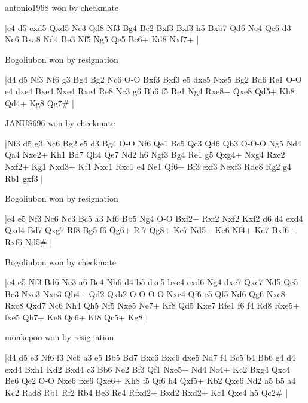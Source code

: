 antonio1968 won by checkmate

\makegametitle
|e4 d5 exd5 Qxd5 Nc3 Qd8 Nf3 Bg4 Be2 Bxf3 Bxf3 h5 Bxb7 Qd6 Ne4 Qe6 d3 Nc6 Bxa8 Nd4 Be3 Nf5 Ng5 Qe5 Bc6+ Kd8 Nxf7+  |

\showboard

Bogoliubon won by resignation

\makegametitle
|d4 d5 Nf3 Nf6 g3 Bg4 Bg2 Nc6 O-O Bxf3 Bxf3 e5 dxe5 Nxe5 Bg2 Bd6 Re1 O-O e4 dxe4 Bxe4 Nxe4 Rxe4 Re8 Nc3 g6 Bh6 f5 Re1 Ng4 Rxe8+ Qxe8 Qd5+ Kh8 Qd4+ Kg8 Qg7\#  |

\showboard

JANUS696 won by checkmate

\makegametitle
|Nf3 d5 g3 Nc6 Bg2 e5 d3 Bg4 O-O Nf6 Qe1 Bc5 Qc3 Qd6 Qb3 O-O-O Ng5 Nd4 Qa4 Nxe2+ Kh1 Bd7 Qh4 Qe7 Nd2 h6 Ngf3 Bg4 Re1 g5 Qxg4+ Nxg4 Rxe2 Nxf2+ Kg1 Nxd3+ Kf1 Nxc1 Rxc1 e4 Ne1 Qf6+ Bf3 exf3 Nexf3 Rde8 Rg2 g4 Rb1 gxf3  |

\showboard

Bogoliubon won by resignation

\makegametitle
|e4 e5 Nf3 Nc6 Nc3 Bc5 a3 Nf6 Bb5 Ng4 O-O Bxf2+ Rxf2 Nxf2 Kxf2 d6 d4 exd4 Qxd4 Bd7 Qxg7 Rf8 Bg5 f6 Qg6+ Rf7 Qg8+ Ke7 Nd5+ Ke6 Nf4+ Ke7 Bxf6+ Rxf6 Nd5\#  |

\showboard

Bogoliubon won by checkmate

\makegametitle
|e4 e5 Nf3 Bd6 Nc3 a6 Bc4 Nh6 d4 b5 dxe5 bxc4 exd6 Ng4 dxc7 Qxc7 Nd5 Qc5 Be3 Nxe3 Nxe3 Qb4+ Qd2 Qxb2 O-O O-O Nxc4 Qf6 e5 Qf5 Nd6 Qg6 Nxc8 Rxc8 Qxd7 Nc6 Nh4 Qh5 Nf5 Nxe5 Ne7+ Kf8 Qd5 Kxe7 Rfe1 f6 f4 Rd8 Rxe5+ fxe5 Qb7+ Ke8 Qc6+ Kf8 Qc5+ Kg8  |

\showboard

monkepoo won by resignation

\makegametitle
|d4 d5 e3 Nf6 f3 Nc6 a3 e5 Bb5 Bd7 Bxc6 Bxc6 dxe5 Nd7 f4 Bc5 b4 Bb6 g4 d4 exd4 Bxh1 Kd2 Bxd4 c3 Bb6 Ne2 Bf3 Qf1 Nxe5+ Nd4 Nc4+ Kc2 Bxg4 Qxc4 Be6 Qe2 O-O Nxe6 fxe6 Qxe6+ Kh8 f5 Qf6 h4 Qxf5+ Kb2 Qxe6 Nd2 a5 b5 a4 Kc2 Rad8 Rb1 Rf2 Rb4 Be3 Re4 Rfxd2+ Bxd2 Rxd2+ Kc1 Qxe4 h5 Qc2\#  |

